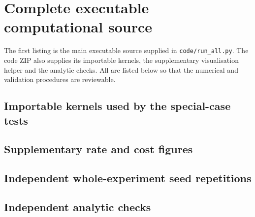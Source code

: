 \clearpage
\section{Complete executable computational source}
\label{app:code}
The first listing is the main executable source supplied in \texttt{code/run\_all.py}. The code ZIP also supplies its importable kernels, the supplementary visualisation helper and the analytic checks. All are listed below so that the numerical and validation procedures are reviewable.

\subsection*{Importable kernels used by the special-case tests}

\subsection*{Supplementary rate and cost figures}

\subsection*{Independent whole-experiment seed repetitions}

\subsection*{Independent analytic checks}


